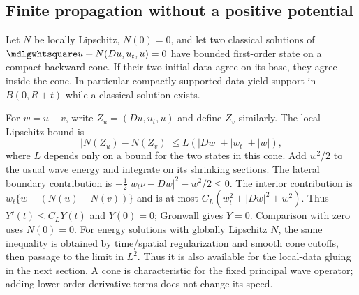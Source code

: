 \subsection{Finite propagation without a positive potential}
\begin{theorem}
Let $N$ be locally Lipschitz, $N(0)=0$, and let two classical solutions
of $\PDEWave u+N(Du,u_t,u)=0$ have bounded first-order state on a compact
backward cone. If their two initial data agree on its base, they
agree inside the cone. In particular compactly supported data yield
support in $B(0,R+t)$ while a classical solution exists.
\end{theorem}
\begin{expandedproof}
For $w=u-v$, write $Z_u=(Du,u_t,u)$ and define $Z_v$ similarly.
The local Lipschitz bound is
\[
 |N(Z_u)-N(Z_v)|\le L(|Dw|+|w_t|+|w|),
\]
where $L$ depends only on a bound for the two states in this cone.
Add $w^2/2$ to the usual wave energy and integrate on its shrinking
sections. The lateral boundary contribution is
$-\frac12|w_t\nu-Dw|^2-w^2/2\le0$.
The interior contribution is $w_t\{w-(N(u)-N(v))\}$ and is at most
$C_L(w_t^2+|Dw|^2+w^2)$. Thus $Y'(t)\le C_LY(t)$ and $Y(0)=0$;
Gronwall gives $Y=0$. Comparison with zero uses $N(0)=0$.
For energy solutions with globally Lipschitz $N$, the same inequality
is obtained by time/spatial regularization and smooth cone cutoffs,
then passage to the limit in $L^2$. Thus it is also available for the
local-data gluing in the next section. A cone is characteristic for
the fixed principal wave operator; adding lower-order derivative
terms does not change its speed.
\end{expandedproof}
